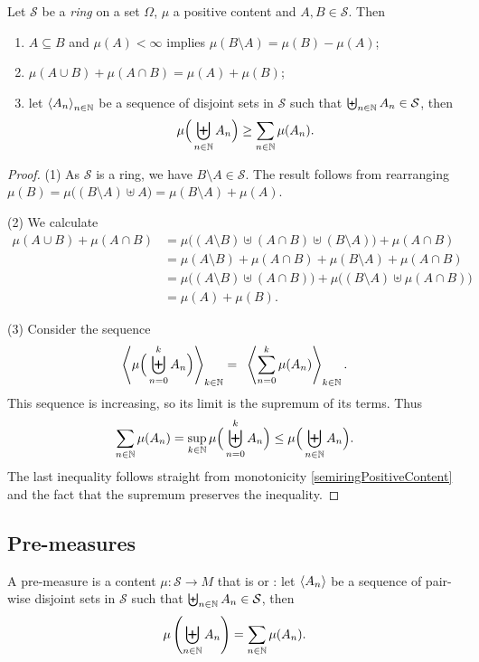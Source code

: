\begin{proposition} \label{ringPositiveContent}
Let $\mathcal{S}$ be a \emph{ring} on a set $\Omega$, $\mu$ a positive content and $A,B\in \mathcal{S}$. Then
\begin{enumerate}
\item $A\subseteq B$ and $\mu(A)<\infty$ implies $\mu(B\setminus A) = \mu(B) - \mu(A)$;
\item $\mu(A \cup B) + \mu(A\cap B) = \mu(A) + \mu(B)$;
\item let $\left\langle A_n \right\rangle_{n\in \mathbb{N}}$ be a sequence of disjoint sets in $\mathcal{S}$ such that $\biguplus_{n\in\mathbb{N}}A_n \in \mathcal{S}$, then
\[ \mu\Big(\biguplus_{n\in\mathbb{N}}A_n\Big) \geq \sum_{n\in\mathbb{N}}\mu(A_n). \]
\end{enumerate}
\end{proposition}
\begin{proof}
(1) As $\mathcal{S}$ is a ring, we have $B\setminus A\in\mathcal{S}$. The result follows from rearranging $\mu(B) = \mu\big((B\setminus A) \uplus A\big) = \mu(B\setminus A) + \mu(A)$.

(2) We calculate
\begin{align*}
\mu(A \cup B) + \mu(A\cap B) &= \mu\big((A\setminus B)\uplus (A\cap B) \uplus (B\setminus A)\big) + \mu(A\cap B) \\
&= \mu(A\setminus B) + \mu(A\cap B) + \mu(B\setminus A) + \mu(A\cap B) \\
&= \mu\big((A\setminus B) \uplus (A\cap B)\big) + \mu\big((B\setminus A) \uplus \mu(A\cap B)\big) \\
&= \mu(A) + \mu(B).
\end{align*}

(3) Consider the sequence
\[ \left\langle \mu\Big(\biguplus_{n=0}^k A_n\Big) \right\rangle_{k\in \mathbb{N}} = \enspace \left\langle \sum_{n=0}^k\mu(A_n) \right\rangle_{k\in\mathbb{N}}. \]
This sequence is increasing, so its limit is the supremum of its terms. Thus
\[ \sum_{n\in\mathbb{N}}\mu(A_n) = \sup_{k\in\mathbb{N}}\mu\Big(\biguplus_{n=0}^k A_n\Big) \leq \mu\Big(\biguplus_{n\in\mathbb{N}}A_n\Big). \]
The last inequality follows straight from monotonicity \ref{semiringPositiveContent} and the fact that the supremum preserves the inequality.
\end{proof}

\subsection{Pre-measures}
\begin{definition}
A pre-measure is a content $\mu:\mathcal{S} \to M$ that is  or : let $\left\langle A_n \right\rangle$ be a sequence of pair-wise disjoint sets in $\mathcal{S}$ such that $\biguplus_{n\in \mathbb{N}}A_n \in \mathcal{S}$, then
\[ \mu\left(\biguplus_{n\in\mathbb{N}}A_n\right) = \sum_{n\in\mathbb{N}}\mu(A_n). \]
\end{definition}


